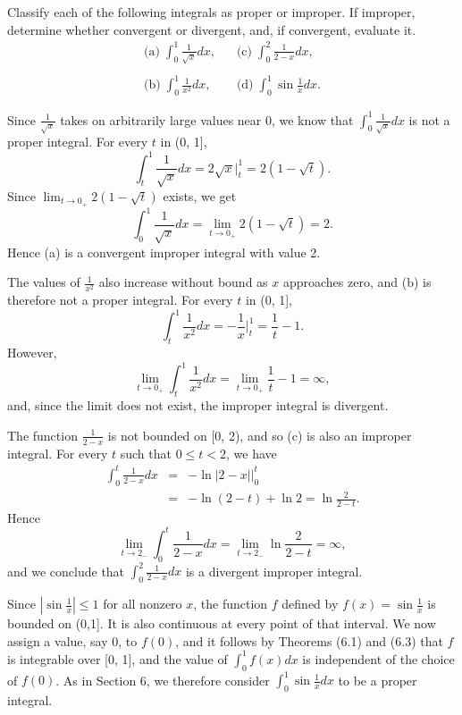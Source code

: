 \begin{example}
Classify each of the following integrals as proper or improper. If improper, determine whether convergent or divergent, and, if convergent, evaluate it.
$$
\begin{array}{ll}
  \mbox{(a)}\; \int_0^1 \frac{1}{\sqrt x} dx,  \;\;\;  
&\mbox{(c)}\; \int_0^2 \frac{1}{2 - x} dx, \\
&\\
  \mbox{(b)}\; \int_0^1 \frac{1}{x^2} dx,   \;\;\;     
&\mbox{(d)}\; \int_0^1 \sin \frac{1}{x} dx.
\end{array}
$$

Since $\frac{1}{\sqrt x}$ takes on arbitrarily large values near 0, we know that $\int_0^1\frac{1}{\sqrt x} dx$ is not a proper integral. For every $t$ in (0, 1], 
$$
\int_t^1 \frac{1}{\sqrt x} dx = 2\sqrt x \big|_t^1 = 2(1 - \sqrt t) .
$$ 
\noindent Since $\lim_{t \rightarrow 0_{+}} 2(1 - \sqrt t)$ exists, we get 
$$
\int_0^1 \frac{1}{\sqrt x} dx =  \lim_{t \rightarrow 0_{+}} 2(1 - \sqrt t) = 2. 
$$
\noindent Hence (a) is a convergent improper integral with value 2.

The values of $\frac{1}{x^2}$ also increase without bound as $x$ approaches zero, and (b) is therefore not a proper integral. For every $t$ in (0, 1],
$$
\int_t^1 \frac{1}{x^2} dx = -\frac{1}{x} \Big|_t^1 = \frac{1}{t} - 1.
$$
\noindent However,
$$
\lim_{t \rightarrow 0_{+}} \int_t^1  \frac{1}{x^2} dx= \lim_{t \rightarrow 0_{+}}  \frac{1}{t} - 1 = \infty,  
$$
\noindent and, since the limit does not exist, the improper integral is divergent.

The function $\frac{1}{2 - x}$ is not bounded on [0, 2), and so (c) is also an improper integral. For every $t$ such that $0 \leq t < 2$, we have
\begin{eqnarray*}
\int_0^t \frac{1}{2 - x} dx 
&=& - \ln |2 - x|\Big|_0^t  \\
&=&  - \ln(2 - t) + \ln 2 = \ln \frac{2}{2 - t}.
\end{eqnarray*}
\noindent Hence 
$$
\lim_{t \rightarrow 2_{-}} \int_0^t \frac{1}{2 - x} dx = \lim_{t \rightarrow 2_{-}} \ln \frac{2}{2 - t}  = \infty,
$$
\noindent and we conclude that $\int_0^2 \frac{1}{2 - x} dx$ is a divergent improper integral.

Since $|\sin \frac{1}{x} | \leq 1$ for all nonzero $x$, the function $f$ defined by $f(x) = \sin \frac{1}{x}$ is bounded on (0,1]. It is also continuous at every point of that interval. We now assign a value, say 0, to $f(0)$, and it follows by Theorems (6.1) and (6.3) that $f$ is integrable over [0, 1], and the value of $\int_0^1 f(x) dx$ is independent of the choice of $f(0)$. As in Section 6, we therefore consider $\int_0^1 \sin \frac{1}{x} dx$ to be a proper integral.
\end{example}

